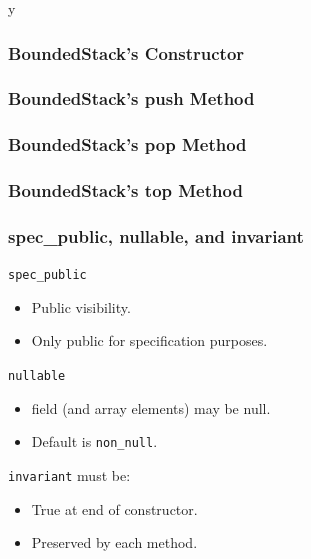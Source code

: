 \if y\MAKEHANDOUTS \documentclass[t,compress,landscape,handout]{beamer}
\begin{document}
\begin{frame}[fragile]
\frametitle{BoundedStack's Constructor}

\end{frame}

\begin{frame}[fragile]
\frametitle{BoundedStack's push Method}

\end{frame}

\begin{frame}[fragile]
\frametitle{BoundedStack's pop Method}

\end{frame}

\begin{frame}[fragile]
\frametitle{BoundedStack's top Method}

\end{frame}

\begin{frame}[fragile]
\frametitle{spec\_public, nullable, and invariant}

\lstinline!spec_public!
\begin{itemize}
\item
Public visibility.

\item
Only public for specification purposes.
\end{itemize}


\lstinline!nullable!
\begin{itemize}
\item
field (and array elements) may be null.

\item
Default is \lstinline!non_null!.
\end{itemize}

\lstinline!invariant! must be:
\begin{itemize}
\item
True at end of constructor.

\item
Preserved by each method.
\end{itemize}

\end{frame}
\end{document}
